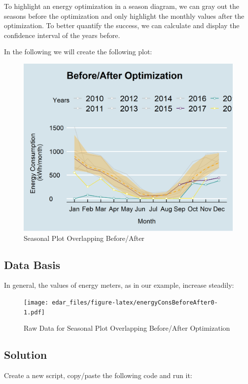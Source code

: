 \documentclass[
]{book}
\begin{document}
To highlight an energy optimization in a season diagram, we can gray out the seasons before the optimization and only highlight the monthly values after the optimization. To better quantify the success, we can calculate and display the confidence interval of the years before.

In the following we will create the following plot:

\begin{figure}
\includegraphics[width=0.7\linewidth]{images/plotEnergyConsBeforeAfter} \caption{Seasonal Plot Overlapping Before/After}\label{fig:unnamed-chunk-7}
\end{figure}

\hypertarget{data-basis-3}{%
\subsection{Data Basis}\label{data-basis-3}}

In general, the values of energy meters, as in our example, increase steadily:

\begin{figure}
\centering
\texttt{[image: edar\_files/figure-latex/energyConsBeforeAfter0-1.pdf]}
\caption{\label{fig:energyConsBeforeAfter0}Raw Data for Seasonal Plot Overlapping Before/After Optimization}
\end{figure}

\hypertarget{solution-3}{%
\subsection{Solution}\label{solution-3}}

Create a new script, copy/paste the following code and run it:
\end{document}
